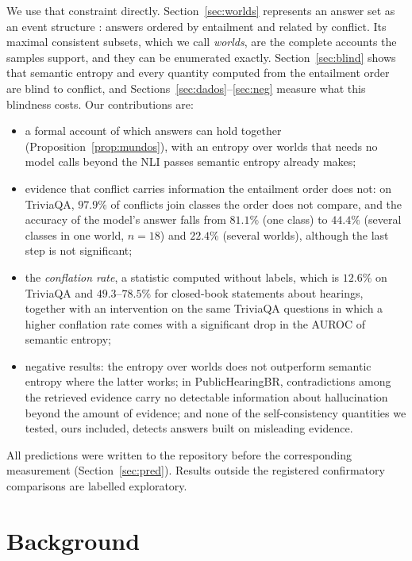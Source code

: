 \documentclass[english]{desafiokunumi}
\theoremstyle{definition}
\theoremstyle{remark}
\begin{document}
We use that constraint directly. Section~\ref{sec:worlds} represents an answer
set as an event structure \citep{winskel1987event}: answers ordered by
entailment and related by conflict. Its maximal consistent subsets, which we
call \emph{worlds}, are the complete accounts the samples support, and they can
be enumerated exactly. Section~\ref{sec:blind} shows that semantic entropy and
every quantity computed from the entailment order are blind to conflict, and
Sections~\ref{sec:dados}--\ref{sec:neg} measure what this blindness costs. Our
contributions are:
\begin{itemize}\setlength{\itemsep}{1pt}
  \item a formal account of which answers can hold together
  (Proposition~\ref{prop:mundos}), with an entropy over worlds that needs no
  model calls beyond the NLI passes semantic entropy already makes;
  \item evidence that conflict carries information the entailment order does
  not: on TriviaQA, $97.9\%$ of conflicts join classes the order does not
  compare, and the accuracy of the model's answer falls from $81.1\%$ (one
  class) to $44.4\%$ (several classes in one world, $n = 18$) and $22.4\%$
  (several worlds), although the last step is not significant;
  \item the \emph{conflation rate}, a statistic computed without labels, which
  is $12.6\%$ on TriviaQA and $49.3$--$78.5\%$ for closed-book statements about
  hearings, together with an intervention on the same TriviaQA questions in
  which a higher conflation rate comes with a significant drop in the AUROC of
  semantic entropy;
  \item negative results: the entropy over worlds does not outperform semantic
  entropy where the latter works; in PublicHearingBR, contradictions among the
  retrieved evidence carry no detectable information about hallucination beyond
  the amount of evidence; and none of the self-consistency quantities we
  tested, ours included, detects answers built on misleading evidence.
\end{itemize}
All predictions were written to the repository before the corresponding
measurement (Section~\ref{sec:pred}). Results outside the registered
confirmatory comparisons are labelled exploratory.

\section{Background}
\label{sec:bg}
\end{document}
